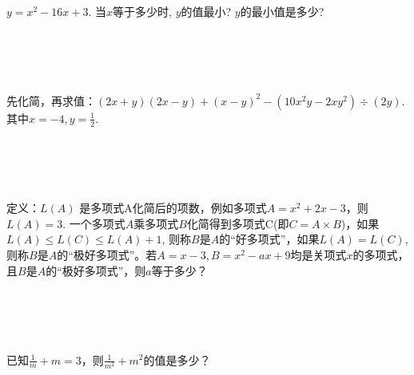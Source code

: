 \item {
    $y=x^2 - 16x + 3$. 当$x$等于多少时, $y$的值最小? $y$的最小值是多少? 
    \ifshowSolution
        \fangsong{}
        \\
    \else
        \\ \\ \\ \\ 
    \fi
}

\item {
    先化简，再求值：$(2x+y)(2x-y) + (x-y)^2 - (10x^2y - 2xy^2)\div (2y)$. 其中$x=-4, y=\frac12$.
    \ifshowSolution
        \fangsong{}
        \\
    \else
        \\ \\ \\ \\ 
    \fi
}

\item {
    定义：$L(A)$ 是多项式A化简后的项数，例如多项式$A=x^2+2x-3$，则$L(A)=3$. 一个多项式$A$乘多项式$B$化简得到多项式C(即$C=A\times B$)，如果$L(A)\leq L(C)\leq L(A)+1$, 则称$B$是$A$的``好多项式''，如果$L(A)=L(C)$, 则称$B$是$A$的``极好多项式''。若$A=x-3, B=x^2-ax+9$均是关项式$x$的多项式，且$B$是$A$的“极好多项式”，则$a$等于多少？
    \ifshowSolution
        \fangsong{}
        \\
    \else
        \\ \\ \\ \\ 
    \fi
}

\item {
    已知$\frac1m + m = 3$，则$\frac{1}{m^2} + m^2$的值是多少？
    \ifshowSolution
        \fangsong{}
        \\
    \else
        \\ \\ \\ \\ 
    \fi
}